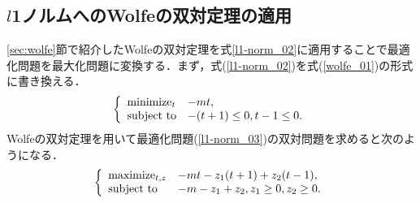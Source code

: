 \documentclass[technicalreport]{ieicej}
\begin{document}
\subsection{$l$1ノルムへのWolfeの双対定理の適用}
\ref{sec:wolfe}節で紹介したWolfeの双対定理を式\ref{l1-norm_02}に適用することで最適化問題を最大化問題に変換する．まず，式(\ref{l1-norm_02})を式(\ref{wolfe_01})の形式に書き換える．
\begin{equation}
  \left\{
  \begin{array}{ll}
    $minimize$_{t} & -mt, \\
    $subject to$ & -(t+1)\leq 0,t-1\leq 0. \label{l1-norm_03}
  \end{array}
  \right.
\end{equation}
Wolfeの双対定理を用いて最適化問題(\ref{l1-norm_03})の双対問題を求めると次のようになる．
\begin{equation}
  \left\{
  \begin{array}{ll}
    $maximize$_{t,z} & -mt-z_{1}(t+1)+z_{2}(t-1), \\
    $subject to$ & -m-z_{1}+z_{2},z_{1}\geq 0,z_{2}\geq 0.
  \end{array}
  \right.
\end{equation}


  
  
\end{document}
